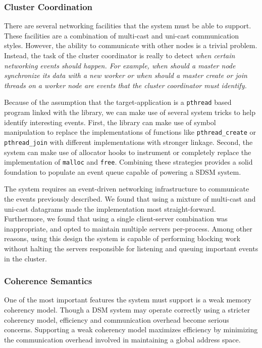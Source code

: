 \subsubsection{Cluster Coordination}
There are several networking facilities that the \projname{} system must be able to support.  These facilities are a combination of multi-cast and uni-cast communication styles.  However, the ability to communicate with other nodes is a trivial problem.  Instead, the task of the cluster coordinator is really to detect \em when \em certain networking events should happen.  For example, \em when \em should a master node synchronize its data with a new worker or \em when \em should a master create or join threads on a worker node are events that the cluster coordinator must identify.

Because of the assumption that the target-application is a \verb,pthread, based program linked with the \projname{} library, we can make use of several system tricks to help identify interesting events.  First, the \projname{} library can make use of symbol manipulation to replace the implementations of functions like \verb,pthread_create, or \verb,pthread_join, with different implementations with stronger linkage.  Second, the \projname{} system can make use of allocator hooks to instrument or completely replace the implementation of \verb,malloc, and \verb,free,.  Combining these strategies provides a solid foundation to populate an event queue capable of powering a SDSM system.

The \projname{} system requires an event-driven networking infrastructure to communicate the events previously described.  We found that using a mixture of multi-cast and uni-cast datagrams made the implementation most straight-forward.  Furthermore, we found that using a single client-server combination was inappropriate, and opted to maintain multiple servers per-process.  Among other reasons, using this design the \projname{} system is capable of performing blocking work without halting the servers responsible for listening and queuing important events in the cluster.


\subsubsection{Coherence Semantics}
One of the most important features the \projname{} system must support is a weak memory coherency model.  Though a DSM system may operate correctly using a stricter coherency model, efficiency and communication overhead become serious concerns.  Supporting a weak coherency model maximizes efficiency by minimizing the communication overhead involved in maintaining a global address space.

